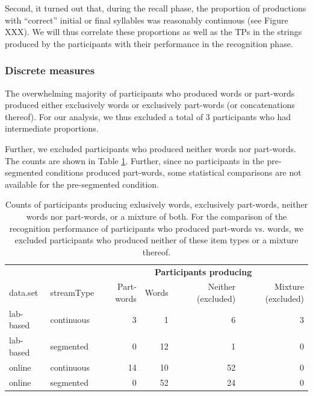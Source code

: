 \documentclass[
]{article}
\begin{document}
Second, it turned out that, during the recall phase, the proportion of
productions with ``correct'' initial or final syllables was reasonably
continuous (see Figure XXX). We will thus correlate these proportions as
well as the TPs in the strings produced by the participants with their
performance in the recognition phase.

\hypertarget{discrete-measures}{%
\subsubsection{Discrete measures}\label{discrete-measures}}

The overwhelming majority of participants who produced words or
part-words produced either exclusively words or exclusively part-words
(or concatenations thereof). For our analysis, we thus excluded a total
of 3 participants who had intermediate proportions.

Further, we excluded participants who produced neither words nor
part-words. The counts are shown in Table
\ref{tab:correlation-recognition-vs-recall-counts}. Further, since no
participants in the pre-segmented conditions produced part-words, some
statistical comparisons are not available for the pre-segmented
condition.

\begin{table}

\caption{\label{tab:correlation-recognition-vs-recall-counts}Counts of participants producing exlusively words, exclusively part-words, neither words nor part-words, or a mixture of both. For the comparison of the recognition performance of participants who produced part-words vs. words, we excluded participants who produced neither of these item types or a mixture thereof.}
\centering
\begin{tabular}[t]{llrrrr}
\toprule
\multicolumn{2}{c}{\textbf{ }} & \multicolumn{4}{c}{\textbf{Participants producing}} \\
\cmidrule(l{3pt}r{3pt}){3-6}
data.set & streamType & Part-words & Words & Neither (excluded) & Mixture (excluded)\\
\midrule
lab-based & continuous & 3 & 1 & 6 & 3\\
lab-based & segmented & 0 & 12 & 1 & 0\\
online & continuous & 14 & 10 & 52 & 0\\
online & segmented & 0 & 52 & 24 & 0\\
\bottomrule
\end{tabular}
\end{table}
\end{document}
